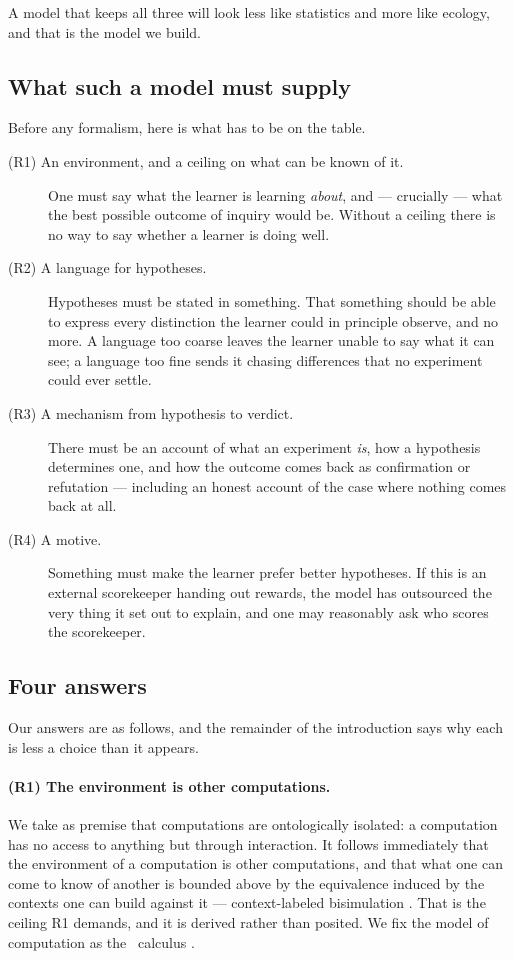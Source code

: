 A model that keeps all three will look less like statistics and more like ecology, and that is the
model we build.

\subsection{What such a model must supply}\label{sci:S1.2}
\label{sci:sec:requirements}

Before any formalism, here is what has to be on the table.

\begin{description}
\item[\textnormal{(R1)} An environment, and a ceiling on what can be known of it.] One must say what
the learner is learning \emph{about}, and --- crucially --- what the best possible outcome of inquiry
would be. Without a ceiling there is no way to say whether a learner is doing well.
\item[\textnormal{(R2)} A language for hypotheses.] Hypotheses must be stated in something. That
something should be able to express every distinction the learner could in principle observe, and no
more. A language too coarse leaves the learner unable to say what it can see; a language too fine
sends it chasing differences that no experiment could ever settle.
\item[\textnormal{(R3)} A mechanism from hypothesis to verdict.] There must be an account of what an
experiment \emph{is}, how a hypothesis determines one, and how the outcome comes back as confirmation
or refutation --- including an honest account of the case where nothing comes back at all.
\item[\textnormal{(R4)} A motive.] Something must make the learner prefer better hypotheses. If this
is an external scorekeeper handing out rewards, the model has outsourced the very thing it set out to
explain, and one may reasonably ask who scores the scorekeeper.
\end{description}

\subsection{Four answers}\label{sci:S1.3}

Our answers are as follows, and the remainder of the introduction says why each is less a choice than
it appears.

\paragraph{(R1) The environment is other computations.} We take as premise that computations are
ontologically isolated: a computation has no access to anything but through interaction. It follows
immediately that the environment of a computation is other computations, and that what one can come to
know of another is bounded above by the equivalence induced by the contexts one can build against it
--- context-labeled bisimulation \cite{Probing}. That is the ceiling R1 demands, and it is derived
rather than posited. We fix the model of computation as the \rhoc\ calculus \cite{RHO}.


